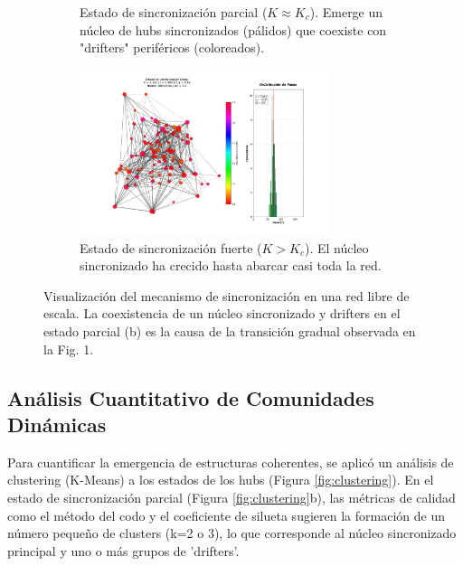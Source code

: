 \documentclass[12pt, a4paper]{article}
\begin{document}
\begin{figure}[htbp]
\begin{subfigure}[b]{\textwidth}
        \caption{Estado de sincronización parcial ($K \approx K_c$). Emerge un núcleo de hubs sincronizados (pálidos) que coexiste con "drifters" periféricos (coloreados).}
        \label{fig:mecanismo_b}
    \end{subfigure}
    \begin{subfigure}[b]{\textwidth}
        \centering
        \includegraphics[width=0.8\textwidth]{img/2_6.png}
        \caption{Estado de sincronización fuerte ($K > K_c$). El núcleo sincronizado ha crecido hasta abarcar casi toda la red.}
        \label{fig:mecanismo_c}
    \end{subfigure}
    \caption{Visualización del mecanismo de sincronización en una red libre de escala. La coexistencia de un núcleo sincronizado y drifters en el estado parcial (b) es la causa de la transición gradual observada en la Fig. 1.}
    \label{fig:mecanismo}
\end{figure}


\subsection{Análisis Cuantitativo de Comunidades Dinámicas}
Para cuantificar la emergencia de estructuras coherentes, se aplicó un análisis de clustering (K-Means) a los estados de los hubs (Figura \ref{fig:clustering}). En el estado de sincronización parcial (Figura \ref{fig:clustering}b), las métricas de calidad como el método del codo y el coeficiente de silueta sugieren la formación de un número pequeño de clusters (k=2 o 3), lo que corresponde al núcleo sincronizado principal y uno o más grupos de 'drifters'.
\end{document}
